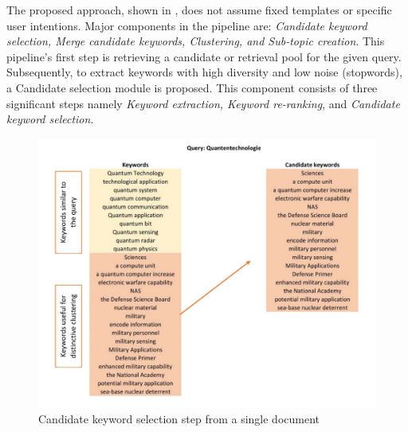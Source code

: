 \documentclass[master,proposal,extern,palatino]{rgseThesis}
\newcommand{\mycomment}[1]{}
\begin{document}
The proposed approach, shown in ,  does not assume fixed templates or specific user intentions. Major components in the pipeline are: \textit{Candidate keyword selection, Merge candidate keywords, Clustering, and Sub-topic creation}. This pipeline's first step is retrieving a candidate or retrieval pool for the given query. Subsequently, to extract keywords with high diversity and low noise (stopwords), a Candidate selection module is proposed.  This component consists of three significant steps namely \textit{Keyword extraction, Keyword re-ranking}, and \textit{Candidate keyword selection}.

\mycomment{
 Noun chunks are extracted from each document with the help of the Spacy\footnote{\url{https://spacy.io/}} library and are further cleaned to remov. To clean these noun chunks, a pipeline is proposed with the following tasks: \textit{Stopword removal, N-gram range (1, 3), Remove punctuation, Remove determiners, Lemmatization, and Remove noun chunks containing numeric, Remove close duplicates using fuzzy matching}. Cleaned noun chunks are then re-ranked according to the cosine similarity to the original document. Top-k noun chunks with highest cosine similarity is selected and further used in clustering. This process of selecting top noun chunks in a document is named Candidate noun-chunk selection and resulting phrases are referred to as keywords. This approach is inspired from the recent research related to using contextualized sentence embeddings for keyphrase extraction~\cite{bennani2018simple}.}

\begin{figure}[h]
	\centering
	\includegraphics[width=.8\textwidth]{images/keynotes_images/candidate_keywords.jpg}
	\caption{Candidate keyword selection step from a single document \label{fig:candidate_keywords}}
\end{figure}
\end{document}
